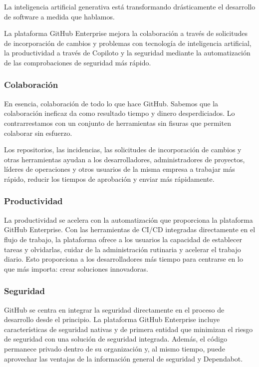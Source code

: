 La inteligencia artificial generativa está transformando drásticamente el desarrollo de software a medida que hablamos.

La plataforma GitHub Enterprise mejora la colaboración a través de solicitudes de incorporación de
cambios y problemas con tecnología de inteligencia artificial, la productividad a través de Copiloto
y la seguridad mediante la automatización de las comprobaciones de seguridad más rápido.

\subsubsection*{Colaboración}

En esencia, colaboración de todo lo que hace GitHub. Sabemos que la colaboración ineficaz da
como resultado tiempo y dinero desperdiciados. Lo contrarrestamos con un conjunto de herramientas 
sin fisuras que permiten colaborar sin esfuerzo.

Los repositorios, las incidencias, las solicitudes de incorporación de cambios y otras 
herramientas ayudan a los desarrolladores, administradores de proyectos, líderes de operaciones y 
otros usuarios de la misma empresa a trabajar más rápido, reducir los tiempos de aprobación y enviar más rápidamente.

\subsubsection*{Productividad}

La productividad se acelera con la automatización que proporciona la plataforma GitHub
Enterprise. Con las herramientas de CI/CD integradas directamente en el flujo de trabajo,
la plataforma ofrece a los usuarios la capacidad de establecer tareas y olvidarlas, cuidar de 
la administración rutinaria y acelerar el trabajo diario. Esto proporciona a los desarrolladores 
más tiempo para centrarse en lo que más importa: crear soluciones innovadoras.

\subsubsection*{Seguridad}

GitHub se centra en integrar la seguridad directamente en el proceso de desarrollo desde el 
principio. La plataforma GitHub Enterprise incluye características de seguridad nativas y de 
primera entidad que minimizan el riesgo de seguridad con una solución de seguridad integrada. 
Además, el código permanece privado dentro de su organización y, al mismo tiempo, puede 
aprovechar las ventajas de la información general de seguridad y Dependabot.

